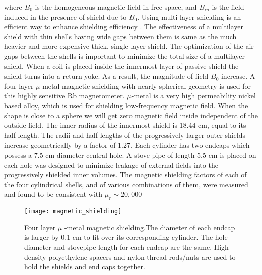 \documentclass[12pt]{report}
\begin{document}
where $B_0$ is the homogeneous magnetic field in free space, and $B_{in}$ is the field induced in the presence of shield due to  $B_0$. Using multi-layer shielding is an efficient way to enhance shielding efficiency\cite{doe:website2} . The effectiveness of a multilayer shield with thin shells having wide gaps between them is same as the much heavier and more expensive thick, single layer shield.
The optimization of the air gaps between the shells is important to minimize the total size of a multilayer shield. When a coil is placed inside the innermost layer of passive shield the shield turns into a return yoke. As a result, the magnitude of field $B_0$ increase. A four layer $\mu$-metal magnetic shielding with nearly spherical geometry is used for this highly sensitive Rb magnetometer. $\mu$-metal is a very high permeability nickel based alloy, which is used for shielding low-frequency magnetic field. When the shape is close to a sphere we will get zero magnetic field inside independent of the outside field. The inner radius of the innermost shield is 18.44 cm, equal to its half-length. The radii and half-lengths of the progressively larger outer shields increase geometrically by a factor of 1.27. Each cylinder has two endcaps which possess a 7.5 cm diameter central hole\cite{Andalib:2016ahj}. A stove-pipe of length 5.5 cm is placed on each hole was designed to minimize leakage of external fields into the progressively shielded inner volumes. The magnetic shielding factors of each of the four cylindrical shells, and of various combinations of them, were measured and found to be consistent with $\mu_r \sim 20, 000$\cite{Martin:2014foa}
\begin{figure}[h]
\centering
\texttt{[image: magnetic\_shielding]}
 \caption{Four layer $\mu$ -metal magnetic shielding.The diameter of
each endcap is larger by 0.1 cm to fit over its corresponding cylinder. The hole diameter and stovepipe length for each endcap are the same. High
density polyethylene spacers and nylon thread rods/nuts are used to hold the shields and end caps together.}
\end{figure}
\newpage
\end{document}
